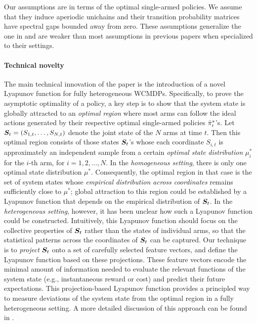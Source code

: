 \documentclass[11pt,letterpaper]{article}
\begin{document}
Our assumptions are in terms of the optimal single-armed policies.
We assume that they induce aperiodic unichains and their transition probability matrices have spectral gaps bounded away from zero.
These assumptions generalize the one in \citep{HonXieChe_23} and are weaker than most assumptions in previous papers when specialized to their settings.


\paragraph{Technical novelty}
The main technical innovation of the paper is the introduction of a novel Lyapunov function for fully heterogeneous WCMDPs. 
Specifically, to prove the asymptotic optimality of a policy, a key step is to show that the system state is globally attracted to an \emph{optimal region} where most arms can follow the ideal actions generated by their respective optimal single-armed policies ${{\bar{\pi}}^*}_i$'s. 
Let ${\bm{S}}_t = (S_{1,t}, \dots, S_{N, t})$ denote the joint state of the $N$ arms at time $t$.
Then this optimal region consists of those states ${\bm{S}}_t$'s whose each coordinate $S_{i,t}$ is approximately an independent sample from a certain \emph{optimal state distribution} $\mu^*_i$ for the $i$-th arm, for $i=1,2,\dots,N$. 
In the \emph{homogeneous setting}, there is only one optimal state distribution $\mu^*$. Consequently, the optimal region in that case is the set of system states whose \emph{empirical distribution across coordinates} remains sufficiently close to $\mu^*$; global attraction to this region could be established by a Lyapunov function that depends on the empirical distribution of ${\bm{S}}_t$. 
In the \emph{heterogeneous setting}, however, it has been unclear how such a Lyapunov function could be constructed. 
Intuitively, this Lyapunov function should focus on the collective properties of ${\bm{S}}_t$ rather than the states of individual arms, so that the statistical patterns across the coordinates of ${\bm{S}}_t$ can be captured. 
Our technique is to \emph{project} ${\bm{S}}_t$ onto a set of carefully selected feature vectors, and define the Lyapunov function based on these projections. 
These feature vectors encode the minimal amount of information needed to evaluate the relevant functions of the system state (e.g., instantaneous reward or cost) and predict their future expectations.  
This projection-based Lyapunov function provides a principled way to measure deviations of the system state from the optimal region in a fully heterogeneous setting. 
A more detailed discussion of this approach can be found in . 
\end{document}
